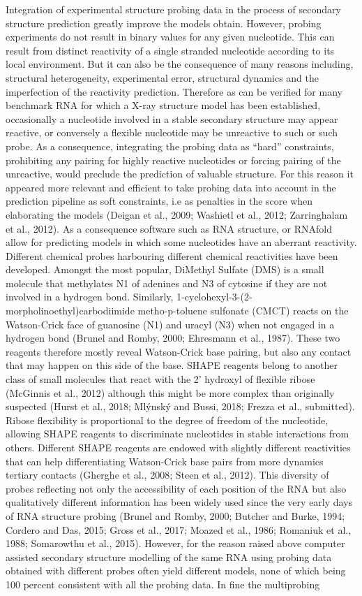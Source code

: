 \documentclass[a4,center,fleqn]{NAR}
\begin{document}
Integration of experimental structure probing data in the process of secondary structure prediction greatly improve the models obtain. However, probing experiments do not result in binary values for any given nucleotide. This can result from distinct reactivity of a single stranded nucleotide according to its local environment. But it can also be the consequence of many reasons including, structural heterogeneity, experimental error, structural dynamics and the imperfection of the reactivity prediction. Therefore as can be verified for many benchmark RNA for which a X-ray structure model has been established, occasionally a nucleotide involved in a stable secondary structure may appear reactive, or conversely a flexible nucleotide may be unreactive to such or such probe. As a consequence, integrating the probing data as “hard” constraints, prohibiting any pairing for highly reactive nucleotides or forcing pairing of the unreactive, would preclude the prediction of valuable structure. For this reason it appeared more relevant and efficient to take probing data into account in the prediction pipeline as soft constraints, i.e as penalties in the score when elaborating the models (Deigan et al., 2009; Washietl et al., 2012; Zarringhalam et al., 2012). As a consequence software such as RNA structure, or RNAfold allow for predicting models in which some nucleotides have an  aberrant reactivity. Different chemical probes harbouring different chemical reactivities have been developed. Amongst the most popular, DiMethyl Sulfate (DMS) is a small molecule that methylates N1 of adenines and N3 of cytosine if they are not involved in a hydrogen bond. Similarly, 1-cyclohexyl-3-(2-morpholinoethyl)carbodiimide metho-p-toluene sulfonate (CMCT) reacts on the Watson-Crick face of guanosine (N1) and uracyl (N3) when not engaged in a hydrogen bond (Brunel and Romby, 2000; Ehresmann et al., 1987). These two reagents therefore mostly reveal Watson-Crick base pairing, but also any contact that may happen on this side of the base. SHAPE reagents belong to another class of small molecules that react with the 2’ hydroxyl of flexible ribose (McGinnis et al., 2012) although this might be more complex than originally suspected (Hurst et al., 2018; Mlýnský and Bussi, 2018; Frezza et al., submitted). Ribose flexibility is proportional to the degree of freedom of the nucleotide, allowing SHAPE reagents to discriminate nucleotides in stable interactions from others. Different SHAPE reagents are endowed with slightly different reactivities that can help differentiating Watson-Crick base pairs from more dynamics tertiary contacts (Gherghe et al., 2008; Steen et al., 2012). This diversity of probes reflecting not only the accessibility of each position of the RNA but also qualitatively different information has been widely used since the very early days of RNA structure probing (Brunel and Romby, 2000; Butcher and Burke, 1994; Cordero and Das, 2015; Gross et al., 2017; Moazed et al., 1986; Romaniuk et al., 1988; Somarowthu et al., 2015). However, for the reason raised above computer assisted secondary structure modelling of the same RNA using probing data obtained with different probes often yield different models, none of which being 100 percent consistent with all the probing data. In fine the multiprobing 
\end{document}
